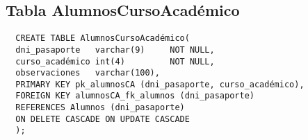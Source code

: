 \subsection{Tabla AlumnosCursoAcadémico}

\begin{verbatim}
  CREATE TABLE AlumnosCursoAcadémico(
  dni_pasaporte   varchar(9)     NOT NULL,
  curso_académico int(4)         NOT NULL,
  observaciones   varchar(100),
  PRIMARY KEY pk_alumnosCA (dni_pasaporte, curso_académico),
  FOREIGN KEY alumnosCA_fk_alumnos (dni_pasaporte)
  REFERENCES Alumnos (dni_pasaporte)
  ON DELETE CASCADE ON UPDATE CASCADE
  );
\end{verbatim}